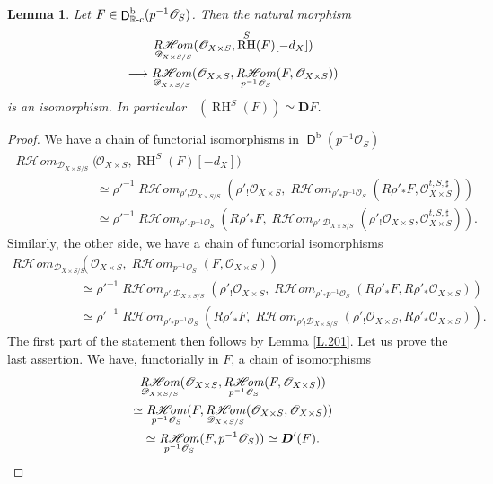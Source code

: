 \documentclass[english]{smfart}
\numberwithin{subsection}{section}
\def\shd{\mathcal{D}}\let\cD\shd
\def\sho{\mathcal{O}}\let\cO\sho
\newcommand{\R}{\mathbb{R}}\let\RR\R
\newcommand{\bD}{\boldsymbol{D}}
\newcommand{\shhom}{\mathcal{H}\!\mathit{om}}\let\ho\shhom
\DeclareMathOperator{\rh}{\mathit{R}\shhom}
\DeclareMathOperator{\RH}{RH}
\newcommand{\rb}{\mathrm{b}}
\newcommand{\rc}{{\R\textup{-c}}}
\newcommand{\XS}{X\times S}
\newcommand{\DXS}{\shd_{\XS/S}}
\DeclareMathOperator{\rD}{\mathsf{D}}
\DeclareMathOperator{\pDR}{{}^\mathrm{p}DR}
\newcommand{\pOS}{p^{-1}\sho_S}
\numberwithin{equation}{section}
\theoremstyle{plain}
\newtheorem{lemma}[equation]{Lemma}
\theoremstyle{definition}
\def\to{\mathchoice{\longrightarrow}{\rightarrow}{\rightarrow}{\rightarrow}}
\begin{document}
\begin{lemma}\label{L:comp}
Let $F\in \rD^\rb_\rc(\pOS)$. Then the natural morphism
\begin{multline*}
\rh_{\DXS}(\sho_{\XS}, \RH^S(F)[-d_X])\\
\to \rh_{\DXS}(\sho_{\XS}, \rh_{\pOS}(F, \sho_{\XS}))
\end{multline*}
is an isomorphism. In particular $\pDR(\RH^S(F))\simeq \bD F$.
\end{lemma}

\begin{proof}
We have a chain of functorial isomorphisms in $\rD^\rb(\pOS)$\begin{align*}
\rh_{\DXS}(&\sho_{\XS}, \RH^S(F)[-d_X])\\
&\simeq \rho'^{-1}\rh_{\rho'_!\DXS}(\rho'_!\sho_{\XS}, \rh_{\rho'_*\pOS}(R\rho'_*F, \sho^{t,S,\sharp}_{\XS}))\\
&\simeq \rho'^{-1}\rh_{\rho'_*\pOS}(R\rho'_*F, \rh_{\rho'_!\DXS}(\rho'_!\sho_{\XS}, \sho^{t,S,\sharp}_{\XS})).
\end{align*}
Similarly, the other side, we have a chain of functorial isomorphisms
\begin{align*}
\rh_{\DXS}&(\sho_{\XS}, \rh_{\pOS}(F, \sho_{\XS}))\\
&\simeq \rho'^{-1}\rh_{\rho'_!\DXS}(\rho'_!\sho_{\XS}, \rh_{\rho'_*\pOS}(R\rho'_*F, R\rho'_*\sho_{\XS}))\\
&\simeq \rho'^{-1}\rh_{\rho'_*\pOS}(R\rho'_*F, \rh_{\rho'_!\DXS}(\rho'_!\sho_{\XS}, R\rho'_*\sho_{\XS})).
\end{align*}
The first part of the statement then follows by Lemma \ref{L.201}. Let us prove the last assertion. We have, functorially in $F$, a chain of isomorphisms
\begin{multline*}
\rh_{\DXS}(\sho_{\XS}, \rh_{\pOS}(F, \sho_{\XS}))\\
\simeq \rh_{\pOS}(F, \rh_{\DXS}(\sho_{\XS},\sho_{\XS}))\\
\simeq \rh_{\pOS}(F, p^{-1}\sho_{S}))\simeq \bD'(F).\qedhere
\end{multline*}
\end{proof}
\end{document}
